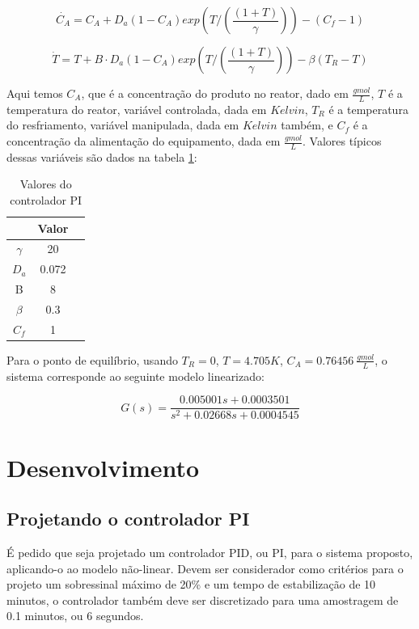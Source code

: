 \documentclass[
	12pt,				%
	openany,			%
	oneside,			%
	a4paper,			%
	english,			%
	french,				%
	spanish,			%
	brazil,				%
	]{abntex2}
\begin{document}
{\begin{equation}
	\dot{C_A} = C_A + D_a(1-C_A)exp\left(T/\left(\frac{(1+T)}{\gamma}\right)\right) - (C_f - 1)
\end{equation}

\begin{equation}
	\dot{T} = T + B \cdot D_a(1-C_A)exp\left(T/\left(\frac{(1+T)}{\gamma}\right)\right) - \beta(T_R - T)
\end{equation}

Aqui temos $C_A$, que é a concentração do produto no reator, dado em $\frac{gmol}{L}$, $T$ é a temperatura do reator, variável controlada, dada em $Kelvin$, $T_R$ é a temperatura do resfriamento, variável manipulada, dada em $Kelvin$ também, e $C_f$ é a concentração da alimentação do equipamento, dada em $\frac{gmol}{L}$. Valores típicos dessas variáveis são dados na tabela \ref{tab:tabela_constantes}:

\begin{table}[h]
	\centering
	\begin{tabular}{ccc}
		\multicolumn{1}{c}{} 
	Constante & Valor &  \\ \hline
	$\gamma$ & 20 &  \\
	$D_a$ & 0.072 &  \\
	B & 8 &  \\
	$\beta$ & 0.3 &  \\
	$C_f$ & 1 & 
	\end{tabular}
	\caption{Valores do controlador PI}
	\label{tab:tabela_constantes}
\end{table}

Para o ponto de equilíbrio, usando $T_R=0$, $T=4.705K$, $C_A = 0.76456 \ \frac{gmol}{L}$, o sistema corresponde ao seguinte modelo linearizado:

\begin{equation}
	G(s) = \frac{0.005001s + 0.0003501}{s^2+0.02668s+0.0004545}
\end{equation}



\chapter{Desenvolvimento}

\section{Projetando o controlador PI}

É pedido que seja projetado um controlador PID, ou PI, para o sistema proposto, aplicando-o ao modelo não-linear. Devem ser considerador como critérios para o projeto um sobressinal máximo de 20\% e um tempo de estabilização de 10 minutos, o controlador também deve ser discretizado para uma amostragem de 0.1 minutos, ou 6 segundos.

}
\end{document}
